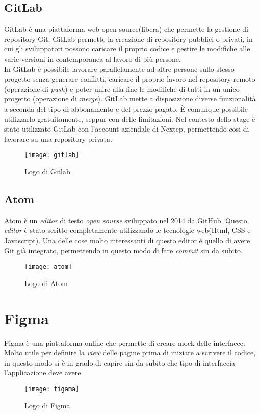 \subsection{GitLab}GitLab è una piattaforma web open source(libera) che permette la gestione di repository Git. GitLab permette la creazione di repository pubblici o privati, in cui gli sviluppatori possono caricare il proprio codice e gestire le modifiche alle varie versioni in contemporanea al lavoro di più persone. 
\\

In GitLab è possibile lavorare parallelamente ad altre persone sullo stesso progetto senza generare conflitti, caricare il proprio lavoro nel repository remoto (operazione di \emph{push}) e poter unire alla fine le modifiche di tutti in un unico progetto (operazione di \emph{merge}). GitLab mette a disposizione diverse funzionalità a seconda del tipo di abbonamento e del prezzo pagato. È comunque possibile utilizzarlo gratuitamente, seppur con delle limitazioni. Nel contesto dello stage è stato utilizzato GitLab con l'account aziendale di Nextep, permettendo cosi di lavorare su una repository privata. 
\begin{figure}[!h] 
	\centering 
	\texttt{[image: gitlab]}
	\caption{Logo di Gitlab}
\end{figure}
\subsection{Atom}
Atom è un \emph{editor} di testo \emph{open sourse} sviluppato nel 2014 da GitHub. Questo \emph{editor} è stato scritto completamente utilizzando le tecnologie web(Html, CSS e Javascript). 
Una delle cose molto interessanti di questo editor è quello di avere Git già integrato, permettendo in questo modo di fare \emph{commit} sin da subito. 
\begin{figure}[!h] 
	\centering 
	\texttt{[image: atom]}
	\caption{Logo di Atom}
\end{figure}
\section{Figma} Figma è una piattaforma online che permette di creare \gls{mock} delle interfacce. Molto utile per definire la \emph{view} delle pagine prima di iniziare a scrivere il codice, in questo modo si è in grado di capire sin da subito che tipo di interfaccia l'applicazione deve avere.
\begin{figure}[!h] 
	\centering 
	\texttt{[image: figama]}
	\caption{Logo di Figma}
\end{figure}
